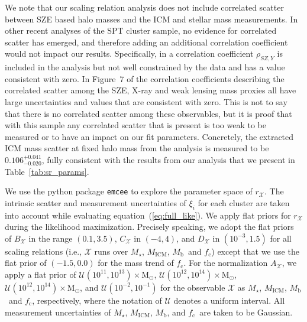 \documentclass[useAMS,usenatbib,iop,numberedappendix]{mn2e}
\newcommand{\Msun}{\ensuremath{\mathrm{M}_{\odot}}}
\newcommand{\Mstar}{\ensuremath{M_{\star}}}
\newcommand{\Mgas}{\ensuremath{M_{\mathrm{ICM}}}}
\newcommand{\Mbary}{\ensuremath{M_{\mathrm{b}}}}
\newcommand{\fcold}{\ensuremath{f_{\mathrm{c}}}}
\begin{document}
We note that our scaling relation analysis does not include correlated scatter between SZE based halo masses and the ICM and stellar mass measurements.  In other recent analyses of the SPT cluster sample, no evidence for correlated scatter has emerged, and therefore adding an additional correlation coefficient would not impact our results.  Specifically, in \citet{dehaan16} a correlation coefficient $\rho_{SZ,Y}$ is included in the analysis but not well constrained by the data and has a value consistent with zero.  In Figure~7 of \citet{dietrich17} the correlation coefficients describing the correlated scatter among the SZE, X-ray and weak lensing mass proxies all have large uncertainties and values that are consistent with zero.  This is not to say that there is no correlated scatter among these observables, but it is proof that with this sample any correlated scatter that is present is too weak to be measured or to have an impact on our fit parameters.
Concretely, the extracted ICM mass scatter at fixed halo mass from the \citet{dietrich17} analysis is measured to be $0.106^{+0.041}_{-0.020}$, fully consistent with the results from our analysis that we present in Table~\ref{tab:sr_params}.


We use the python package \texttt{emcee} \citep{foreman13} to explore the parameter space of $r_{\mathcal{X}}$.
The intrinsic scatter and measurement uncertainties of $\xi_{i}$ for each cluster are taken into account while evaluating equation~(\ref{eq:full_like}). 
We apply flat priors for $r_{\mathcal{X}}$ during the likelihood maximization.
Precisely speaking, we adopt the flat priors of $B_{\mathcal{X}}$ in the range $(0.1, 3.5)$, $C_{\mathcal{X}}$ in $(-4,4)$, and $D_{\mathcal{X}}$ in $(10^{-3}, 1.5)$ for all scaling relations (i.e., $\mathcal{X}$ runs over \Mstar, \Mgas, \Mbary\ and \fcold) except that we use the flat prior of $(-1.5,0.0)$ for the mass trend of \fcold.
For the normalization $A_{\mathcal{X}}$, we apply a flat prior of 
$\mathcal{U}(10^{11}, 10^{13})\times\Msun$,
$\mathcal{U}(10^{12}, 10^{14})\times\Msun$, 
$\mathcal{U}(10^{12}, 10^{14})\times\Msun$, and 
$\mathcal{U}(10^{-2}, 10^{-1})$
for the observable $\mathcal{X}$ as \Mstar, \Mgas, \Mbary\ and \fcold,  respectively,
where the notation of $\mathcal{U}$ denotes a uniform interval.
All measurement uncertainties of \Mstar, \Mgas, \Mbary, and \fcold\ are taken to be Gaussian.


%
%
\end{document}
